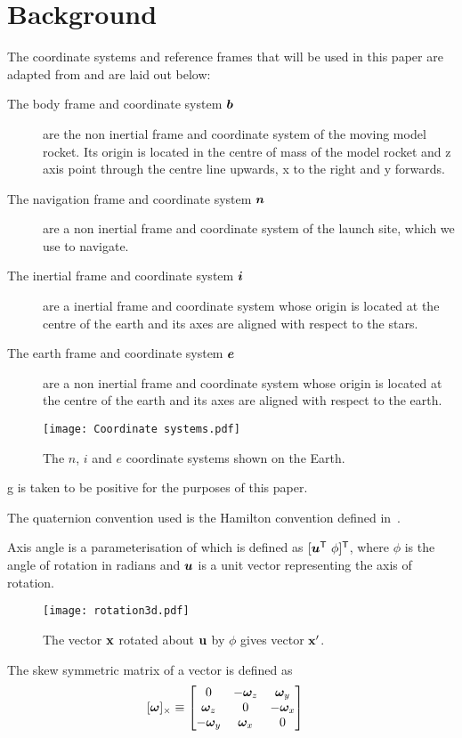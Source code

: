 \section{Background}
\label{sec:definitions}

The coordinate systems and reference frames that will be used in this paper are adapted from \cite{Kok2017} and are laid out below:
\begin{description}
    \item[The body frame and coordinate system $\bm b$] are the non inertial frame and coordinate system of the moving model rocket.
    Its origin is located in the centre of mass of the model rocket and z axis point through the centre line upwards, x to the right and y forwards.
    \item[The navigation frame and coordinate system $\bm n$] are a non inertial frame and coordinate system of the launch site, which we use to navigate.
    \item[The inertial frame and coordinate system $\bm i$] are a inertial frame and coordinate system whose origin is located at the centre of the earth and its axes are aligned with respect to the stars.
    \item[The earth frame and coordinate system $\bm e$] are a non inertial frame and coordinate system whose origin is located at the centre of the earth and its axes are aligned with respect to the earth.
\end{description}

\begin{figure}[h]
    \centering
    \texttt{[image: Coordinate systems.pdf]}
    \caption{The $n$, $i$ and $e$ coordinate systems shown on the Earth.~\cite{Kok2017}}
\end{figure}

g is taken to be positive for the purposes of this paper.

The quaternion convention used is the Hamilton convention defined in~\cite{Sol2017}.

Axis angle is a parameterisation of  which is defined as $[\bm u^\mathsf{T} \ \phi]^\mathsf{T}$, where $\phi$ is the angle of rotation in radians and $\bm u$ is a unit vector representing the axis of rotation.

\begin{figure}[h]
    \centering
    \texttt{[image: rotation3d.pdf]}
    \caption{The vector $\bf x$ rotated about $\bf u$ by $\phi$ gives vector $\bf x'$.\cite{Sol2017}}
\end{figure}

The skew symmetric matrix of a vector is defined as
\begin{align} \label{eq:crossProductMatrix}
    [\bm{\omega}]_\times &\equiv \begin{bmatrix}
        0 & -\bm{\omega}_z & \bm{\omega}_y \\
        \bm{\omega}_z & 0 & -\bm{\omega}_x \\
        - \bm{\omega}_y & \bm{\omega}_x & 0
    \end{bmatrix}
\end{align}